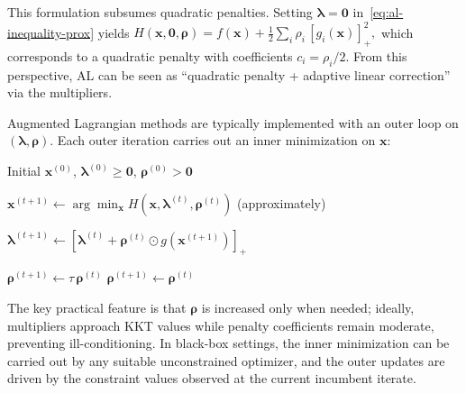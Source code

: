\documentclass[11pt,a4paper]{article}
\numberwithin{equation}{section}
\numberwithin{figure}{section}
\numberwithin{table}{section}
\theoremstyle{definition}
\newcommand{\pos}[1]{\left[#1\right]_+}
\begin{document}
This formulation subsumes quadratic penalties. Setting $\bm{\lambda}=\bm{0}$ in~\eqref{eq:al-inequality-prox} yields
\(
H(\bm{x},\bm{0},\bm{\rho}) = f(\bm{x}) + \frac{1}{2}\sum_i \rho_i\,\pos{g_i(\bm{x})}^2,
\)
which corresponds to a quadratic penalty with coefficients $c_i=\rho_i/2$.\cite{DufosseHansen} From this perspective, AL can be seen as ``quadratic penalty + adaptive linear correction'' via the multipliers.

Augmented Lagrangian methods are typically implemented with an outer loop on $(\bm{\lambda},\bm{\rho})$. Each outer iteration carries out an inner minimization on $\bm{x}$:
\par

\begin{algorithm}[H]
\caption{AL outer loop (inequality constraints)}
\label{alg:alm}
\begin{algorithmic}[1]

\Require Initial $\bm{x}^{(0)}$, $\bm{\lambda}^{(0)} \ge \bm{0}$, $\bm{\rho}^{(0)} > \bm{0}$


\State $\bm{x}^{(t+1)} \gets 
\arg\min_{\bm{x}} H(\bm{x},\bm{\lambda}^{(t)},\bm{\rho}^{(t)})$ (approximately)

\State $\bm{\lambda}^{(t+1)} \gets 
\pos{\bm{\lambda}^{(t)} + \bm{\rho}^{(t)} \odot g(\bm{x}^{(t+1)})}$

    \State $\bm{\rho}^{(t+1)} \gets \tau\,\bm{\rho}^{(t)}$ 
\Else
    \State $\bm{\rho}^{(t+1)} \gets \bm{\rho}^{(t)}$
\EndIf

\EndFor

\end{algorithmic}
\end{algorithm}

The key practical feature is that $\bm{\rho}$ is increased only when needed; ideally, multipliers approach KKT values while penalty coefficients remain moderate, preventing ill-conditioning.\cite{NocedalWright}
In black-box settings, the inner minimization can be carried out by any suitable unconstrained optimizer, and the outer updates are driven by the constraint values observed at the current incumbent iterate.
\end{document}
